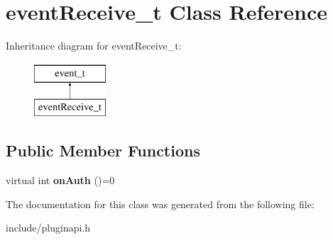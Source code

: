 \hypertarget{classeventReceive__t}{\section{event\-Receive\-\_\-t \-Class \-Reference}
\label{classeventReceive__t}
}
\-Inheritance diagram for event\-Receive\-\_\-t\-:\begin{figure}[H]
\begin{center}
\leavevmode
\includegraphics[height=2.000000cm]{classeventReceive__t}
\end{center}
\end{figure}
\subsection*{\-Public \-Member \-Functions}
\begin{DoxyCompactItemize}
\item 
\hypertarget{classeventReceive__t_ab019a5042f54a109f5428cc70810d148}{virtual int {\bfseries on\-Auth} ()=0}\label{classeventReceive__t_ab019a5042f54a109f5428cc70810d148}

\end{DoxyCompactItemize}


\-The documentation for this class was generated from the following file\-:\begin{DoxyCompactItemize}
\item 
include/pluginapi.\-h\end{DoxyCompactItemize}
